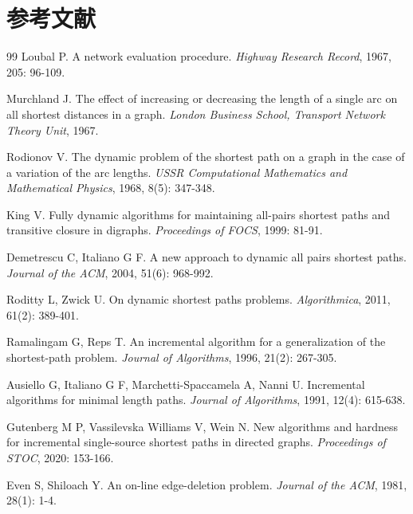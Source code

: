 \documentclass[12pt,a4paper]{ctexart}
\let\oldsection\section
\renewcommand{\section}{\clearpage\oldsection}
\begin{document}
\section{参考文献}
\let\oldsection\section
\renewcommand{\section}{\clearpage\oldsection}

\begin{thebibliography}{99}
 Loubal P. A network evaluation procedure. \textit{Highway Research Record}, 1967, 205: 96-109.

 Murchland J. The effect of increasing or decreasing the length of a single arc on all shortest distances in a graph. \textit{London Business School, Transport Network Theory Unit}, 1967.

 Rodionov V. The dynamic problem of the shortest path on a graph in the case of a variation of the arc lengths. \textit{USSR Computational Mathematics and Mathematical Physics}, 1968, 8(5): 347-348.

 King V. Fully dynamic algorithms for maintaining all-pairs shortest paths and transitive closure in digraphs. \textit{Proceedings of FOCS}, 1999: 81-91.

 Demetrescu C, Italiano G F. A new approach to dynamic all pairs shortest paths. \textit{Journal of the ACM}, 2004, 51(6): 968-992.

 Roditty L, Zwick U. On dynamic shortest paths problems. \textit{Algorithmica}, 2011, 61(2): 389-401.

 Ramalingam G, Reps T. An incremental algorithm for a generalization of the shortest-path problem. \textit{Journal of Algorithms}, 1996, 21(2): 267-305.

 Ausiello G, Italiano G F, Marchetti-Spaccamela A, Nanni U. Incremental algorithms for minimal length paths. \textit{Journal of Algorithms}, 1991, 12(4): 615-638.

 Gutenberg M P, Vassilevska Williams V, Wein N. New algorithms and hardness for incremental single-source shortest paths in directed graphs. \textit{Proceedings of STOC}, 2020: 153-166.

 Even S, Shiloach Y. An on-line edge-deletion problem. \textit{Journal of the ACM}, 1981, 28(1): 1-4.


\end{thebibliography}
\end{document}
